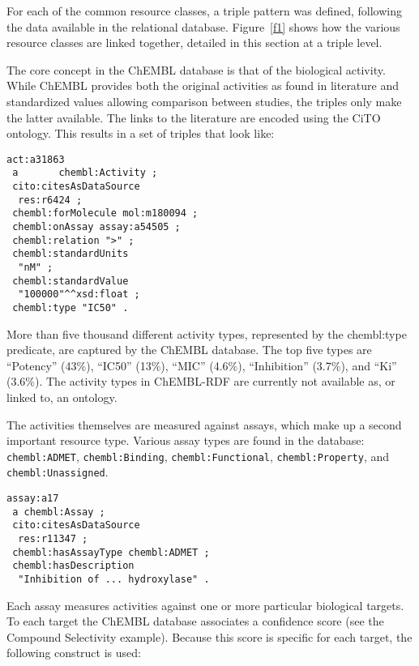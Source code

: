 \documentclass[10pt]{bmc_article}
\newenvironment{bmcformat}{\begin{raggedright}\baselineskip20pt\sloppy\setboolean{publ}{false}}{\end{raggedright}\baselineskip20pt\sloppy}
\begin{document}
\begin{bmcformat}
For each of the common resource classes, a triple pattern was defined, following the
data available in the relational database. Figure~\ref{f1} shows how the various resource
classes are linked together, detailed in this section at a triple level.


The core concept in the ChEMBL database is that of the biological activity. 
While ChEMBL provides both the original activities as found in literature
and standardized values allowing comparison between studies, the triples only
make the latter available. The links to the literature are encoded using the CiTO ontology.
This results in a set of triples that look like:

\begin{small}
\begin{verbatim}
act:a31863
 a       chembl:Activity ;
 cito:citesAsDataSource
  res:r6424 ;
 chembl:forMolecule mol:m180094 ;
 chembl:onAssay assay:a54505 ;
 chembl:relation ">" ;
 chembl:standardUnits
  "nM" ;
 chembl:standardValue
  "100000"^^xsd:float ;
 chembl:type "IC50" .
\end{verbatim}
\end{small}

More than five thousand different activity types, represented by the chembl:type predicate,
are captured by the ChEMBL database.
The top five types are ``Potency'' (43\%), ``IC50'' (13\%), ``MIC'' (4.6\%), ``Inhibition'' (3.7\%),
and ``Ki'' (3.6\%). The activity types in ChEMBL-RDF are currently not available as, or
linked to, an ontology.

The activities themselves are measured against assays, which make up a second important
resource type. Various assay types are found in the database: \verb+chembl:ADMET+, \verb+chembl:Binding+,
\verb+chembl:Functional+, \verb+chembl:Property+, and \verb+chembl:Unassigned+.

\begin{small}
\begin{verbatim}
assay:a17
 a chembl:Assay ;
 cito:citesAsDataSource
  res:r11347 ;
 chembl:hasAssayType chembl:ADMET ;
 chembl:hasDescription
  "Inhibition of ... hydroxylase" .
\end{verbatim}
\end{small}

Each assay measures activities against one or more particular biological targets. To each
target the ChEMBL database associates a confidence score (see the Compound Selectivity
example). Because this score is specific
for each target, the following construct is used:


\end{bmcformat}
\end{document}
